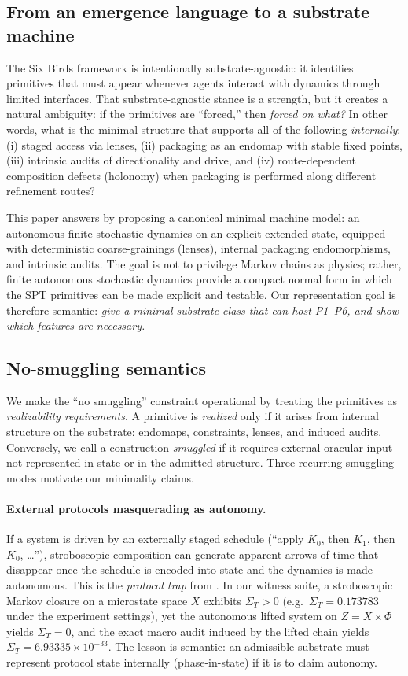 \documentclass[11pt]{article}
\theoremstyle{definition}
\theoremstyle{remark}
\newcommand{\PTSigmaStrob}{0.173783}
\newcommand{\PTSigmaLift}{0}
\newcommand{\PTSigmaProj}{\ensuremath{6.93335\times 10^{-33}}}
\begin{document}
\subsection{From an emergence language to a substrate machine}

The Six Birds framework is intentionally substrate-agnostic: it identifies primitives that must appear whenever agents interact with dynamics through limited interfaces.
That substrate-agnostic stance is a strength, but it creates a natural ambiguity:
if the primitives are ``forced,'' then \emph{forced on what?}
In other words, what is the minimal structure that supports all of the following \emph{internally}:
(i) staged access via lenses, (ii) packaging as an endomap with stable fixed points, (iii) intrinsic audits of directionality and drive, and (iv) route-dependent composition defects (holonomy) when packaging is performed along different refinement routes?

This paper answers by proposing a canonical minimal machine model: an autonomous finite stochastic dynamics on an explicit extended state, equipped with deterministic coarse-grainings (lenses), internal packaging endomorphisms, and intrinsic audits.
The goal is not to privilege Markov chains as physics; rather, finite autonomous stochastic dynamics provide a compact normal form in which the SPT primitives can be made explicit and testable.
Our representation goal is therefore semantic:
\emph{give a minimal substrate class that can host P1--P6, and show which features are necessary.}

\subsection{No-smuggling semantics}

We make the ``no smuggling'' constraint operational by treating the primitives as \emph{realizability requirements}.
A primitive is \emph{realized} only if it arises from internal structure on the substrate:
endomaps, constraints, lenses, and induced audits.
Conversely, we call a construction \emph{smuggled} if it requires external oracular input not represented in state or in the admitted structure.
Three recurring smuggling modes motivate our minimality claims.

\paragraph{External protocols masquerading as autonomy.}
If a system is driven by an externally staged schedule (``apply $K_0$, then $K_1$, then $K_0$, \dots''), stroboscopic composition can generate apparent arrows of time that disappear once the schedule is encoded into state and the dynamics is made autonomous.
This is the \emph{protocol trap} from \citet{sixbirds2026}.
In our witness suite, a stroboscopic Markov closure on a microstate space $X$ exhibits $\Sigma_T>0$ (e.g.\ $\Sigma_T=\PTSigmaStrob$ under the experiment settings), yet the autonomous lifted system on $Z=X\times\Phi$ yields $\Sigma_T=\PTSigmaLift$, and the exact macro audit induced by the lifted chain yields $\Sigma_T=\PTSigmaProj$.
The lesson is semantic: an admissible substrate must represent protocol state internally (phase-in-state) if it is to claim autonomy.
\end{document}
